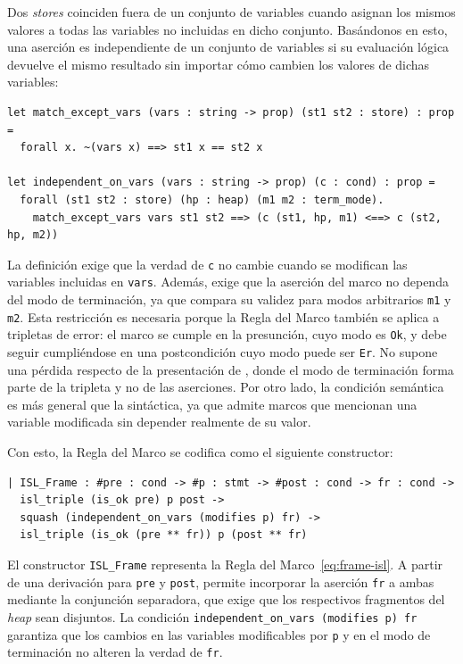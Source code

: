 \documentclass[a4paper,	11pt]{report}
\begin{document}
Dos \emph{stores} coinciden fuera de un conjunto de variables cuando asignan los mismos valores a todas las variables no incluidas en dicho conjunto.
Basándonos en esto,
una aserción es independiente de un conjunto de variables si su evaluación lógica devuelve el mismo resultado
sin importar cómo cambien los valores de dichas variables:

\begin{lstlisting}
let match_except_vars (vars : string -> prop) (st1 st2 : store) : prop =
  forall x. ~(vars x) ==> st1 x == st2 x

let independent_on_vars (vars : string -> prop) (c : cond) : prop =
  forall (st1 st2 : store) (hp : heap) (m1 m2 : term_mode).
    match_except_vars vars st1 st2 ==> (c (st1, hp, m1) <==> c (st2, hp, m2))
\end{lstlisting}

La definición exige que la verdad de \lstinline|c| no cambie cuando se modifican las variables incluidas en \lstinline|vars|.
Además,
exige que la aserción del marco no dependa del modo de terminación,
ya que compara su validez para modos arbitrarios \lstinline|m1| y \lstinline|m2|.
Esta restricción es necesaria porque la Regla del Marco también se aplica a tripletas de error:
el marco se cumple en la presunción,
cuyo modo es \lstinline|Ok|,
y debe seguir cumpliéndose en una postcondición cuyo modo puede ser \lstinline|Er|.
No supone una pérdida respecto de la presentación de \citet{isl},
donde el modo de terminación forma parte de la tripleta y no de las aserciones.
Por otro lado,
la condición semántica es más general que la sintáctica,
ya que admite marcos que mencionan una variable modificada sin depender realmente de su valor.

Con esto, la Regla del Marco se codifica como el siguiente constructor:

\begin{lstlisting}
| ISL_Frame : #pre : cond -> #p : stmt -> #post : cond -> fr : cond ->
  isl_triple (is_ok pre) p post ->
  squash (independent_on_vars (modifies p) fr) ->
  isl_triple (is_ok (pre ** fr)) p (post ** fr)
\end{lstlisting}

El constructor \lstinline|ISL_Frame| representa la Regla del Marco~\ref{eq:frame-isl}.
A partir de una derivación para \lstinline|pre| y \lstinline|post|,
permite incorporar la aserción \lstinline|fr| a ambas mediante la conjunción separadora,
que exige que los respectivos fragmentos del \emph{heap} sean disjuntos.
La condición \lstinline|independent_on_vars (modifies p) fr| garantiza que
los cambios en las variables modificables por \lstinline|p| y en el modo de terminación no alteren la verdad de \lstinline|fr|.
\end{document}
